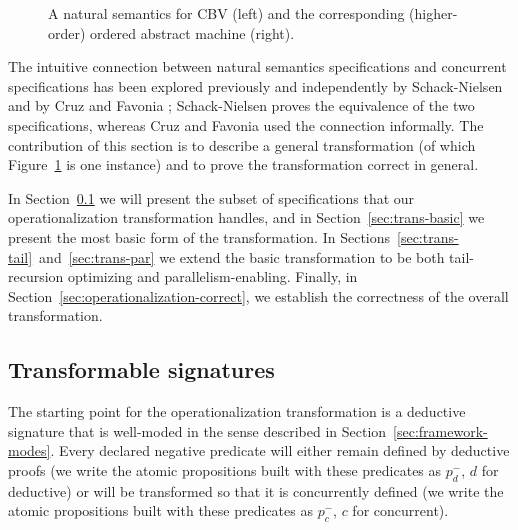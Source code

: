 \begin{figure}
\begin{minipage}[b]{0.36\linewidth}
\end{minipage}
\hspace{0.5cm}
\begin{minipage}[b]{0.64\linewidth}
\end{minipage}
\caption{A natural semantics for CBV (left) and the corresponding (higher-order)
  ordered abstract machine (right).}
\label{fig:example-transform-cbv}
\end{figure}

The intuitive connection between natural semantics specifications and
concurrent specifications has been explored previously and
independently by Schack-Nielsen \cite{schacknielsen07induction} and by
Cruz and Favonia \cite{cruz12parallel}; Schack-Nielsen proves the
equivalence of the two specifications, whereas Cruz and Favonia used
the connection informally. The contribution of this section is to
describe a general transformation (of which
Figure~\ref{fig:example-transform-cbv} is one instance) and to prove
the transformation correct in general. 

In Section~\ref{sec:trans-subset} we will present the subset of
specifications that our operationalization transformation handles, and
in Section~\ref{sec:trans-basic} we present the most basic form of the
transformation.  In
Sections~\ref{sec:trans-tail}~and~\ref{sec:trans-par} we extend the
basic transformation to be both tail-recursion optimizing and
parallelism-enabling. Finally, in
Section~\ref{sec:operationalization-correct}, we establish the
correctness of the overall transformation.

\subsection{Transformable signatures}
\label{sec:trans-subset}

The starting point for the operationalization transformation is a
deductive signature that is well-moded in the sense described in
Section~\ref{sec:framework-modes}. Every declared negative predicate
will either remain defined by deductive proofs (we write the atomic
propositions built with these predicates as $p_d^-$, $d$ for
deductive) or will be transformed so that it is concurrently defined
(we write the atomic propositions built with these predicates as
$p_c^-$, $c$ for concurrent).

